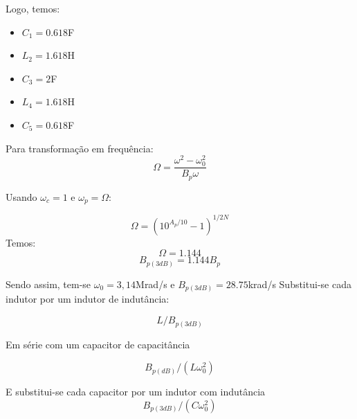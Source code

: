 \documentclass[14pt, oneside]{book}
\theoremstyle{definition}
\begin{document}
            Logo, temos:
            
            \begin{itemize}
                \item $C_1= 0.618$F
                \item $L_2 = 1.618$H
                \item $C_3= 2$F
                \item $L_4 = 1.618$H
                \item $C_5 = 0.618$F
            \end{itemize}
            
            Para transformação em frequência:
            \begin{equation}
            \Omega = \frac{\omega^2-\omega_0^2}{B_p\omega}
            \end{equation}
            
            Usando $\omega_c = 1$ e $\omega_p = \Omega$:
            
            \begin{equation}
            \Omega = (10^{A_p/10}-1)^{1/2N}
            \end{equation}
            Temos:
            \begin{equation}
            \Omega = 1.144
            \end{equation}
            \begin{equation}
            B_{p(3dB)} = 1.144B_p
            \end{equation}
            
            Sendo assim, tem-se $\omega_0 =3,14$Mrad/s e $B_{p(3dB)} = 28.75$krad/s
            Substitui-se cada indutor por um indutor de indutância:
            
            \begin{equation}
            L/B_{p(3dB)}
            \end{equation}
            
            Em série com um capacitor de capacitância
            
            \begin{equation}
            B_{p(dB)}/(L\omega_0^2)
            \end{equation}
            
            E substitui-se cada capacitor por um indutor com indutância
            \begin{equation}
            B_{p(3dB)}/(C\omega_0^2)
            \end{equation}
            
\end{document}
